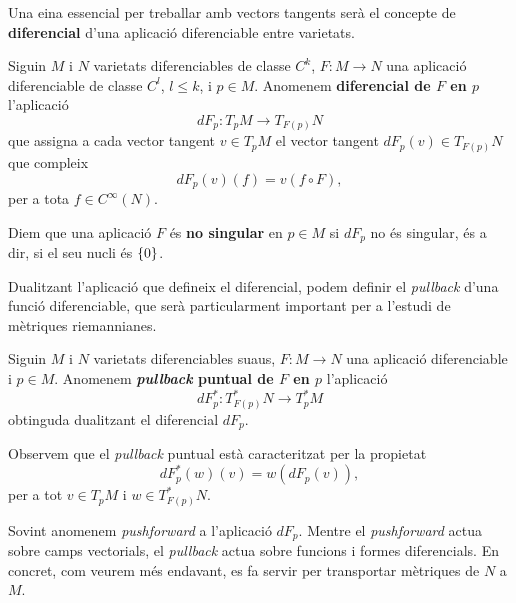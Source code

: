 Una eina essencial per treballar amb vectors tangents serà el concepte de \textbf{diferencial} d'una aplicació diferenciable entre varietats.
\begin{defi}
    Siguin $M$ i $N$ varietats diferenciables de classe $C^k$, $F:M\to N$ una aplicació diferenciable de classe $C^l$, $l\le k$, i $p\in M$. Anomenem \textbf{diferencial de $F$ en $p$} l'aplicació
    \begin{equation*}
        dF_p:T_pM\to T_{F(p)}N
    \end{equation*}
    que assigna a cada vector tangent $v\in T_pM$ el vector tangent $dF_p(v)\in T_{F(p)}N$ que compleix
    \begin{equation*}
        dF_p(v)(f) = v(f\circ F),
    \end{equation*}
    per a tota $f\in C^\infty(N)$.
\end{defi}
\begin{defi}
    Diem que una aplicació $F$ és \textbf{no singular} en $p\in M$ si $dF_p$ no és singular, és a dir, si el seu nucli és $\{0\}$.
\end{defi}
Dualitzant l'aplicació que defineix el diferencial, podem definir el \textit{pullback} d'una funció diferenciable, que serà particularment important per a l'estudi de mètriques riemannianes.
\begin{defi}
    Siguin $M$ i $N$ varietats diferenciables suaus, $F:M\to N$ una aplicació diferenciable i $p\in M$. Anomenem \textbf{\textit{pullback} puntual de $F$ en $p$} l'aplicació
    \begin{equation*}
        dF_p^*:T_{F(p)}^*N\to T^*_pM 
    \end{equation*}
    obtinguda dualitzant el diferencial $dF_p$.
\end{defi}
Observem que el \textit{pullback} puntual està caracteritzat per la propietat
\begin{equation*}
    dF_p^*(w)(v) = w(dF_p(v)),
\end{equation*}
per a tot $v\in T_pM$ i $w\in T^*_{F(p)}N$.
\begin{obs}
    Sovint anomenem \textit{pushforward} a l'aplicació $dF_p$. Mentre el \textit{pushforward} actua sobre camps vectorials, el \textit{pullback} actua sobre funcions i formes diferencials. En concret, com veurem més endavant, es fa servir per transportar mètriques de $N$ a $M$.
\end{obs}


